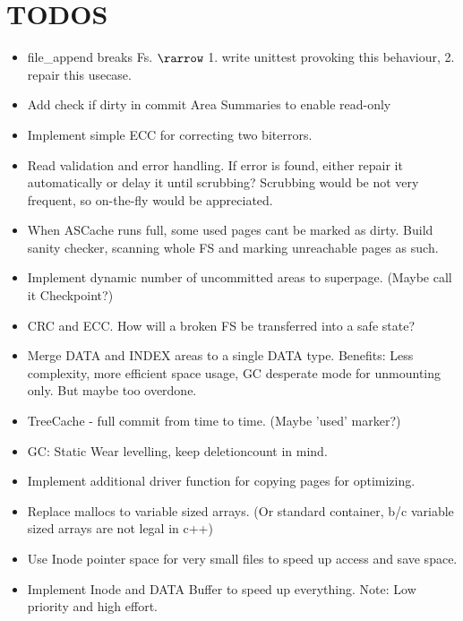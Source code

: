 \section{TODOS}
\begin{itemize}
    \item file_append breaks Fs. $\rarrow$ 1. write unittest provoking this behaviour, 2. repair this usecase.
    \item Add check if dirty in commit Area Summaries to enable read-only
    \item Implement simple ECC for correcting two biterrors.
    \item Read validation and error handling. If error is found, either repair it automatically or delay it until scrubbing? Scrubbing would be not very frequent, so on-the-fly would be appreciated.
	\item When ASCache runs full, some used pages cant be marked as dirty. Build sanity checker, scanning whole FS and marking unreachable pages as such.
	\item Implement dynamic number of uncommitted areas to superpage. (Maybe call it Checkpoint?)
	\item CRC and ECC. How will a broken FS be transferred into a safe state?
	\item Merge DATA and INDEX areas to a single DATA type. Benefits: Less complexity, more efficient space usage, GC desperate mode for unmounting only. But maybe too overdone.
	\item TreeCache - full commit from time to time. (Maybe 'used' marker?)
	\item GC: Static Wear levelling, keep deletioncount in mind.
	\item Implement additional driver function for copying pages for optimizing.
	\item Replace mallocs to variable sized arrays. (Or standard container, b/c variable sized arrays are not legal in c++)
	\item Use Inode pointer space for very small files to speed up access and save space.
	\item Implement Inode and DATA Buffer to speed up everything. Note: Low priority and high effort.
\end{itemize}
